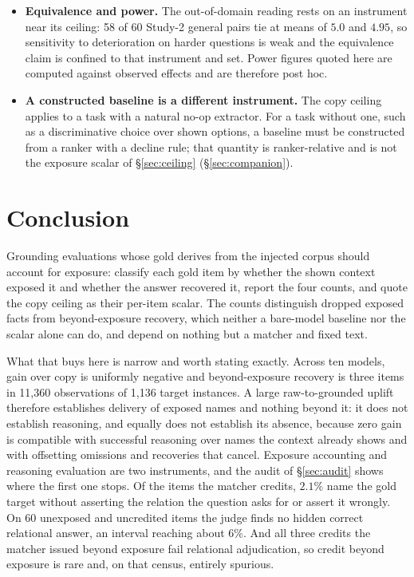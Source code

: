 \documentclass[10pt,twocolumn]{article}
\begin{document}
\begin{itemize}[topsep=2pt,itemsep=2pt,leftmargin=1.4em]
\item \textbf{Equivalence and power.} The out-of-domain reading rests on an instrument near its ceiling: 58 of 60 Study-2 general pairs tie at means of $5.0$ and $4.95$, so sensitivity to deterioration on harder questions is weak and the equivalence claim is confined to that instrument and set. Power figures quoted here are computed against observed effects and are therefore post hoc.
\item \textbf{A constructed baseline is a different instrument.} The copy ceiling applies to a task with a natural no-op extractor. For a task without one, such as a discriminative choice over shown options, a baseline must be constructed from a ranker with a decline rule; that quantity is ranker-relative and is not the exposure scalar of \S\ref{sec:ceiling} (\S\ref{sec:companion}).
\end{itemize}

\section{Conclusion}\label{sec:conclusion}
Grounding evaluations whose gold derives from the injected corpus should account for exposure: classify each gold item by whether the shown context exposed it and whether the answer recovered it, report the four counts, and quote the copy ceiling as their per-item scalar. The counts distinguish dropped exposed facts from beyond-exposure recovery, which neither a bare-model baseline nor the scalar alone can do, and depend on nothing but a matcher and fixed text.

What that buys here is narrow and worth stating exactly. Across ten models, gain over copy is uniformly negative and beyond-exposure recovery is three items in 11{,}360 observations of 1{,}136 target instances. A large raw-to-grounded uplift therefore establishes delivery of exposed names and nothing beyond it: it does not establish reasoning, and equally does not establish its absence, because zero gain is compatible with successful reasoning over names the context already shows and with offsetting omissions and recoveries that cancel. Exposure accounting and reasoning evaluation are two instruments, and the audit of \S\ref{sec:audit} shows where the first one stops. Of the items the matcher credits, $2.1\%$ name the gold target without asserting the relation the question asks for or assert it wrongly. On 60 unexposed and uncredited items the judge finds no hidden correct relational answer, an interval reaching about $6\%$. And all three credits the matcher issued beyond exposure fail relational adjudication, so credit beyond exposure is rare and, on that census, entirely spurious.
\end{document}
